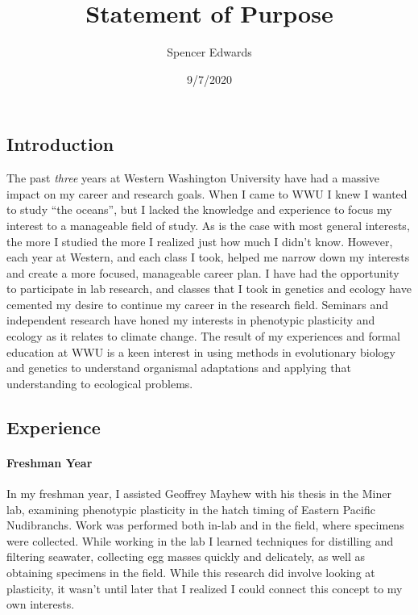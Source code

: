 \documentclass{article}
\title{Statement of Purpose}
\author{Spencer Edwards}
\date{9/7/2020}
\begin{document}
  \maketitle%

\hypertarget{introduction}{%
\subsection{Introduction}\label{introduction}}

The past \emph{three} years at Western Washington University have had a
massive impact on my career and research goals. When I came to WWU I
knew I wanted to study ``the oceans'', but I lacked the knowledge and
experience to focus my interest to a manageable field of study. As is
the case with most general interests, the more I studied the more I
realized just how much I didn't know. However, each year at Western, and
each class I took, helped me narrow down my interests and create a more
focused, manageable career plan. I have had the opportunity to
participate in lab research, and classes that I took in genetics and
ecology have cemented my desire to continue my career in the research
field. Seminars and independent research have honed my interests in
phenotypic plasticity and ecology as it relates to climate change. The
result of my experiences and formal education at WWU is a keen interest
in using methods in evolutionary biology and genetics to understand
organismal adaptations and applying that understanding to ecological
problems.

\hypertarget{experience}{%
\subsection{Experience}\label{experience}}

\hypertarget{freshman-year}{%
\paragraph{Freshman Year}\label{freshman-year}}

In my freshman year, I assisted Geoffrey Mayhew with his thesis in the
Miner lab, examining phenotypic plasticity in the hatch timing of
Eastern Pacific Nudibranchs. Work was performed both in-lab and in the
field, where specimens were collected. While working in the lab I
learned techniques for distilling and filtering seawater, collecting egg
masses quickly and delicately, as well as obtaining specimens in the
field. While this research did involve looking at plasticity, it wasn't
until later that I realized I could connect this concept to my own
interests.
\end{document}
